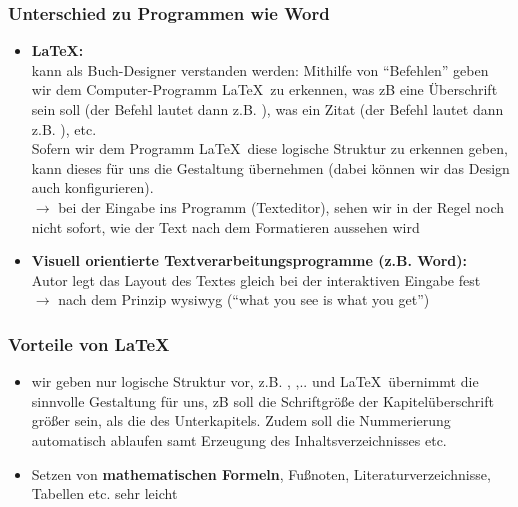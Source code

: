 \subsubsection{Unterschied zu Programmen wie Word}
\begin{itemize}
	\item \textbf{\LaTeX:}\\ kann als Buch-Designer verstanden werden: Mithilfe von ``Befehlen'' geben wir dem Computer-Programm \LaTeX~zu erkennen, was zB eine Überschrift sein soll (der Befehl lautet dann z.B. ), was ein Zitat (der Befehl lautet dann z.B. ), etc.\\
	Sofern wir dem Programm \LaTeX~diese logische Struktur zu erkennen geben, kann dieses für uns die Gestaltung übernehmen (dabei können wir das Design auch konfigurieren).\\[0.1cm]
	$\to$ bei der Eingabe ins Programm (Texteditor), sehen wir in der Regel noch nicht sofort, wie der Text nach dem Formatieren aussehen wird \\
	\item \textbf{Visuell orientierte Textverarbeitungsprogramme (z.B. Word):}\\ Autor legt das Layout des Textes gleich bei der interaktiven Eingabe fest\\[0.1cm]
	$\to$ nach dem Prinzip wysiwyg (``what you see is what you get'')
\end{itemize}

\subsubsection{Vorteile von \LaTeX}
\begin{itemize}
	\item wir geben nur logische Struktur vor, z.B. , ,.. und \LaTeX\ übernimmt die sinnvolle Gestaltung für uns, zB soll die Schriftgröße der Kapitelüberschrift größer sein, als die des Unterkapitels. Zudem soll die Nummerierung automatisch ablaufen samt Erzeugung des Inhaltsverzeichnisses etc.
	\item Setzen von \textbf{mathematischen Formeln}, Fußnoten, Literaturverzeichnisse, Tabellen etc. sehr leicht
\end{itemize}
